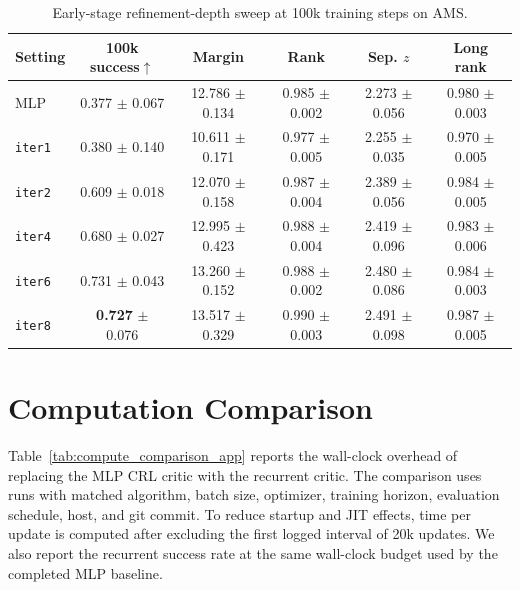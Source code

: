 \documentclass{article}
\begin{document}
\begin{table}[h]
\centering
\scriptsize
\setlength{\tabcolsep}{3pt}
\caption{Early-stage refinement-depth sweep at 100k training steps on AMS.}
\label{tab:depth_early_app}
\begin{tabular}{lccccc}
\toprule
Setting & 100k success$\uparrow$ & Margin & Rank & Sep. $z$ & Long rank \\
\midrule
MLP & 0.377 $\pm$ 0.067 & 12.786 $\pm$ 0.134 & 0.985 $\pm$ 0.002 & 2.273 $\pm$ 0.056 & 0.980 $\pm$ 0.003 \\
\texttt{iter1} & 0.380 $\pm$ 0.140 & 10.611 $\pm$ 0.171 & 0.977 $\pm$ 0.005 & 2.255 $\pm$ 0.035 & 0.970 $\pm$ 0.005 \\
\texttt{iter2} & 0.609 $\pm$ 0.018 & 12.070 $\pm$ 0.158 & 0.987 $\pm$ 0.004 & 2.389 $\pm$ 0.056 & 0.984 $\pm$ 0.005 \\
\texttt{iter4} & 0.680 $\pm$ 0.027 & 12.995 $\pm$ 0.423 & 0.988 $\pm$ 0.004 & 2.419 $\pm$ 0.096 & 0.983 $\pm$ 0.006 \\
\texttt{iter6} & 0.731 $\pm$ 0.043 & 13.260 $\pm$ 0.152 & 0.988 $\pm$ 0.002 & 2.480 $\pm$ 0.086 & 0.984 $\pm$ 0.003 \\
\texttt{iter8} & \textbf{0.727} $\pm$ 0.076 & 13.517 $\pm$ 0.329 & 0.990 $\pm$ 0.003 & 2.491 $\pm$ 0.098 & 0.987 $\pm$ 0.005 \\
\bottomrule
\end{tabular}
\end{table}
\FloatBarrier

\section{Computation Comparison}\label{app:compute-comparison}
Table~\ref{tab:compute_comparison_app} reports the wall-clock overhead of replacing the MLP CRL critic with the recurrent critic. The comparison uses runs with matched algorithm, batch size, optimizer, training horizon, evaluation schedule, host, and git commit. To reduce startup and JIT effects, time per update is computed after excluding the first logged interval of 20k updates. We also report the recurrent success rate at the same wall-clock budget used by the completed MLP baseline.
\end{document}
